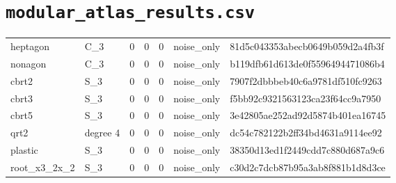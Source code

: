 \documentclass[10pt]{article}
\begin{document}
\section*{\texttt{modular\_atlas\_results.csv}}
{\footnotesize
\begin{longtable}{@{}lllllll@{}}
\toprule
\midrule\endhead
heptagon & C\_3 & 0 & 0 & 0 & noise\_only & 81d5c043353abecb0649b059d2a4fb3f \\
nonagon & C\_3 & 0 & 0 & 0 & noise\_only & b119dfb61d613de0f5596494471086b4 \\
cbrt2 & S\_3 & 0 & 0 & 0 & noise\_only & 7907f2dbbbeb40c6a9781df510fc9263 \\
cbrt3 & S\_3 & 0 & 0 & 0 & noise\_only & f5bb92c9321563123ca23f64cc9a7950 \\
cbrt5 & S\_3 & 0 & 0 & 0 & noise\_only & 3e42805ae252ad92d5874b401ea16745 \\
qrt2 & degree 4 & 0 & 0 & 0 & noise\_only & dc54c782122b2ff34bd4631a9114ee92 \\
plastic & S\_3 & 0 & 0 & 0 & noise\_only & 38350d13ed1f2449cdd7c880d687a9c6 \\
root\_x3\_2x\_2 & S\_3 & 0 & 0 & 0 & noise\_only & c30d2c7dcb87b95a3ab8f881b1d8d3ce \\
\bottomrule
\end{longtable}}
\end{document}
